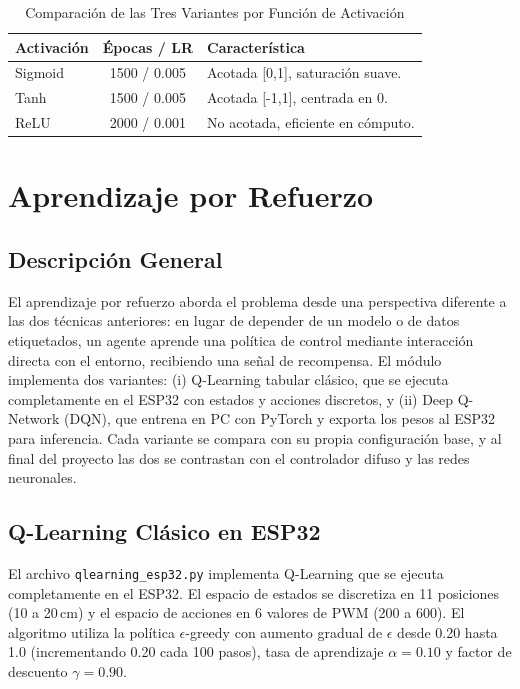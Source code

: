 \documentclass[conference]{IEEEtran}
\begin{document}
\begin{table}[H]
\centering
\caption{Comparación de las Tres Variantes por Función de Activación}
\label{tab:activaciones}
\begin{tabular}{lcl}
\toprule
\textbf{Activación} & \textbf{Épocas / LR} & \textbf{Característica} \\
\midrule
Sigmoid & 1500 / 0.005 & Acotada [0,1], saturación suave. \\
Tanh    & 1500 / 0.005 & Acotada [-1,1], centrada en 0. \\
ReLU    & 2000 / 0.001 & No acotada, eficiente en cómputo. \\
\bottomrule
\end{tabular}
\end{table}

\section{Aprendizaje por Refuerzo}
\label{sec:rl}

\subsection{Descripción General}

El aprendizaje por refuerzo aborda el problema desde una perspectiva diferente a las dos técnicas anteriores: en lugar de depender de un modelo o de datos etiquetados, un agente aprende una política de control mediante interacción directa con el entorno, recibiendo una señal de recompensa. El módulo implementa dos variantes: (i) Q-Learning tabular clásico, que se ejecuta completamente en el ESP32 con estados y acciones discretos, y (ii) Deep Q-Network (DQN), que entrena en PC con PyTorch y exporta los pesos al ESP32 para inferencia. Cada variante se compara con su propia configuración base, y al final del proyecto las dos se contrastan con el controlador difuso y las redes neuronales.

\subsection{Q-Learning Clásico en ESP32}

El archivo \texttt{qlearning\_esp32.py} implementa Q-Learning que se ejecuta completamente en el ESP32. El espacio de estados se discretiza en 11 posiciones (10 a 20\,cm) y el espacio de acciones en 6 valores de PWM (200 a 600). El algoritmo utiliza la política $\epsilon$-greedy con aumento gradual de $\epsilon$ desde 0.20 hasta 1.0 (incrementando 0.20 cada 100 pasos), tasa de aprendizaje $\alpha = 0.10$ y factor de descuento $\gamma = 0.90$.
\end{document}
